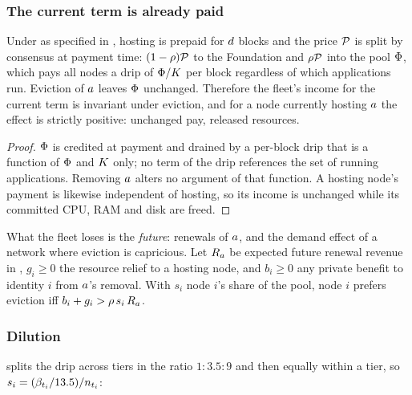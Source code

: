 \subsubsection{The current term is already paid}

\begin{proposition}
\label{prop:23:neutral}
Under \PNR{} as specified in , hosting is prepaid for $d$ blocks and the price
$\mathcal{P}$ is split by consensus at payment time: $(1-\rho)\mathcal{P}$ to the Foundation and
$\rho\mathcal{P}$ into the pool $\Phi$, which pays all nodes a drip of $\Phi/K$ per block
regardless of which applications run. Eviction of $a$ leaves $\Phi$ unchanged. Therefore the
fleet's income for the current term is invariant under eviction, and for a node currently hosting
$a$ the effect is strictly positive: unchanged pay, released resources.
\end{proposition}

\begin{proof}
$\Phi$ is credited at payment and drained by a per-block drip that is a function of $\Phi$ and
$K$ only; no term of the drip references the set of running applications. Removing $a$ alters
no argument of that function. A hosting node's payment is likewise independent of hosting, so its
income is unchanged while its committed CPU, RAM and disk are freed.
\end{proof}

What the fleet loses is the \emph{future}: renewals of $a$, and the demand effect of a network
where eviction is capricious. Let $R_{a}$ be expected future renewal revenue in \flux, $g_i \ge 0$
the resource relief to a hosting node, and $b_i \ge 0$ any private benefit to identity $i$ from
$a$'s removal. With $s_i$ node $i$'s share of the pool, node $i$ prefers eviction iff
$b_i + g_i > \rho\, s_i\, R_{a}$.

\subsubsection{Dilution}

\PNR{} splits the drip across tiers in the ratio $1 : 3.5 : 9$ and then equally within a tier, so
$s_i = (\beta_{t_i}/13.5)/n_{t_i}$:


